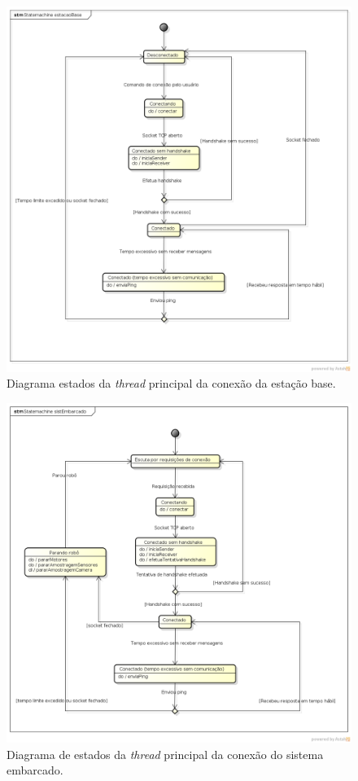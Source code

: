 \begin{figure}[H]
  \centering
  \includegraphics[width=\textwidth, keepaspectratio]{./figuras/diagrama_estados_estacao_base.png}
  \caption{Diagrama estados da \textit{thread} principal da conexão da estação base.}
  \label{fig:diagrama_estados_estacao_base}
\end{figure}

\begin{figure}[H]
  \centering
  \includegraphics[width=\textwidth, keepaspectratio]{./figuras/diagrama_estados_sist_embarcado.png}
  \caption{Diagrama de estados da \textit{thread} principal da conexão do sistema embarcado.}
  \label{fig:diagrama_estados_sist_embarcado}
\end{figure}

